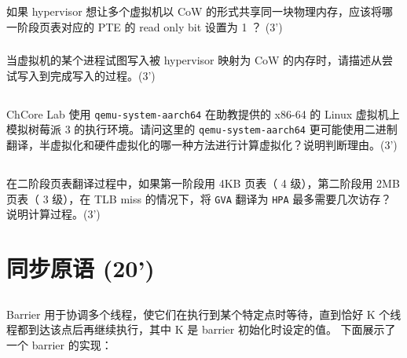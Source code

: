 \documentclass[a4paper,12pt]{article}
\newcommand{\score}[1]{(#1')}
\begin{document}
如果 hypervisor 想让多个虚拟机以 CoW 的形式共享同一块物理内存，应该将哪一阶段页表对应的 PTE 的 read only bit 设置为 1 ？ \score{3}

\begin{answer}
  \lipsum[3]
\end{answer}

\subsubsection{}

当虚拟机的某个进程试图写入被 hypervisor 映射为 CoW 的内存时，请描述从尝试写入到完成写入的过程。\score{3}

\begin{answer}
  \lipsum[3]
\end{answer}

\subsection{}

ChCore Lab 使用 \verb|qemu-system-aarch64| 在助教提供的 x86-64 的 Linux 虚拟机上模拟树莓派 3 的执行环境。请问这里的 \verb|qemu-system-aarch64| 更可能使用二进制翻译，半虚拟化和硬件虚拟化的哪一种方法进行计算虚拟化？说明判断理由。\score{3}

\begin{answer}
  \lipsum[3]
\end{answer}

\subsection{}

在二阶段页表翻译过程中，如果第一阶段用 4KB 页表（ 4 级），第二阶段用 2MB 页表（ 3 级），在 TLB miss 的情况下，将 \verb|GVA| 翻译为 \verb|HPA| 最多需要几次访存？说明计算过程。\score{3}

\begin{answer}
  \lipsum[3]
\end{answer}

\section{同步原语 \score{20}}

\subsection{}

Barrier 用于协调多个线程，使它们在执行到某个特定点时等待，直到恰好 K 个线程都到达该点后再继续执行，其中 K 是 barrier 初始化时设定的值。
下面展示了一个 barrier 的实现：
\end{document}

